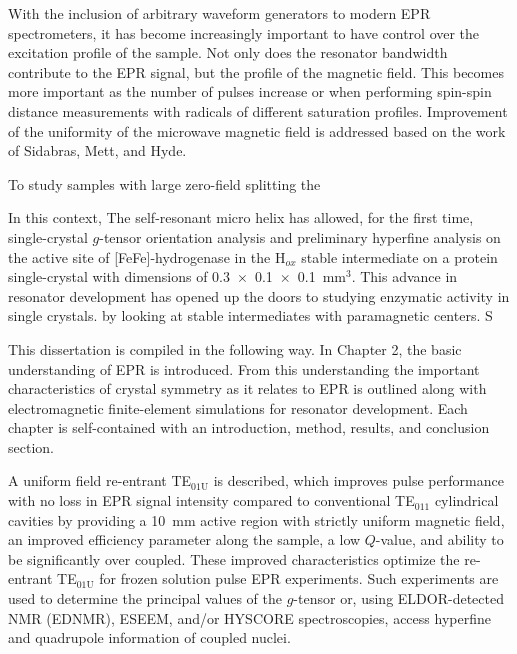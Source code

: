 With the inclusion of arbitrary waveform generators to modern EPR spectrometers, it has become increasingly important to have control over the excitation profile of the sample. \cite{DOLL201418,WILI201826} Not only does the resonator bandwidth contribute to the EPR signal,\cite{Tschaggelar2017} but the profile of the magnetic field. This becomes more important as the number of pulses increase \cite{MILIKISYANTS200948,C7CP01488K,C6CP03067J,BREITGOFF2019106560} or when performing spin-spin distance measurements with radicals of different saturation profiles. \cite{C8CP01276H} Improvement of the uniformity of the microwave magnetic field is addressed based on the work of Sidabras, Mett, and Hyde. \cite{HydeUFRev2019}



To study samples with large zero-field splitting the 

In this context, The self-resonant micro helix has allowed, for the first time, single-crystal $g$-tensor orientation analysis and preliminary hyperfine analysis on the active site of [FeFe]-hydrogenase in the H$_{ox}$ stable intermediate on a protein single-crystal with dimensions of 0.3~$\times$~0.1~$\times$~0.1~mm$^3$. This advance in resonator development has opened up the doors to studying enzymatic activity in single crystals. by looking at stable intermediates with paramagnetic centers. S








This dissertation is compiled in the following way. In Chapter 2, the basic understanding of EPR is introduced. From this understanding the important characteristics of crystal symmetry as it relates to EPR is outlined along with electromagnetic finite-element simulations for resonator development. Each chapter is self-contained with an introduction, method, results, and conclusion section. 

A uniform field re-entrant TE$_{\text{01U}}$ is described, which improves pulse performance with no loss in EPR signal intensity compared to conventional TE$_{011}$ cylindrical cavities by providing a 10~mm active region with strictly uniform magnetic field, an improved efficiency parameter along the sample, a low $Q$-value, and ability to be significantly over coupled. These improved characteristics optimize the re-entrant TE$_{\text{01U}}$ for frozen solution pulse EPR experiments. Such experiments are used to determine the principal values of the $g$-tensor or, using ELDOR-detected NMR (EDNMR), ESEEM, and/or HYSCORE spectroscopies, access hyperfine and quadrupole information of coupled nuclei. 

